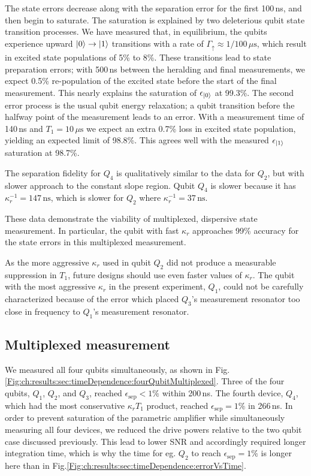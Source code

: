 The state errors decrease along with the separation error for the first 100\,ns, and then begin to saturate.
The saturation is explained by two deleterious qubit state transition processes.
We have measured that, in equilibrium, the qubits experience upward $|0\rangle\rightarrow|1\rangle$ transitions with a rate of $\Gamma_{\uparrow}\approx 1/100\,\mu\text{s}$, which result in excited state populations of 5\% to 8\%.
These transitions lead to state preparation errors; with 500\,ns between the heralding and final measurements, we expect 0.5\% re-population of the excited state before the start of the final measurement.
This nearly explains the saturation of $\epsilon_{|0\rangle}$ at 99.3\%.
The second error process is the usual qubit energy relaxation; a qubit transition before the halfway point of the measurement leads to an error.
With a measurement time of 140\,ns and $T_1=10\,\mu\text{s}$ we expect an extra 0.7\% loss in excited state population, yielding an expected limit of 98.8\%.
This agrees well with the measured $\epsilon_{|1\rangle}$ saturation at 98.7\%.

The separation fidelity for $Q_4$ is qualitatively similar to the data for $Q_2$, but with slower approach to the constant slope region.
Qubit $Q_4$ is slower because it has $\kappa_r^{-1}=147\,\text{ns}$, which is slower for $Q_2$ where $\kappa_r^{-1}=37\,\text{ns}$.

These data demonstrate the viability of multiplexed, dispersive state measurement.
In particular, the qubit with fast $\kappa_r$ approaches 99\% accuracy for the state errors in this multiplexed measurement.

As the more aggressive $\kappa_r$ used in qubit $Q_2$ did not produce a measurable suppression in $T_1$, future designs should use even faster values of $\kappa_r$.
The qubit with the most aggressive $\kappa_r$ in the present experiment, $Q_1$, could not be carefully characterized because of the error which placed $Q_3$'s measurement resonator too close in frequency to $Q_1$'s measurement resonator.

\subsection{Multiplexed measurement}

We measured all four qubits simultaneously, as shown in Fig.\,\ref{Fig:ch:results:sec:timeDependence:fourQubitMultiplexed}.
Three of the four qubits, $Q_1$, $Q_2$, and $Q_3$, reached $\epsilon_{\text{sep}}<1\%$ within 200\,ns.
The fourth device, $Q_4$, which had the most conservative $\kappa_r T_1$ product, reached $\epsilon_{\text{sep}}=1\%$ in 266\,ns.
In order to prevent saturation of the parametric amplifier while simultaneously measuring all four devices, we reduced the drive powers relative to the two qubit case discussed previously.
This lead to lower SNR and accordingly required longer integration time, which is why the time for eg. $Q_2$ to reach $\epsilon_{\text{sep}}=1\%$ is longer here than in Fig.\ref{Fig:ch:results:sec:timeDependence:errorVsTime}.

